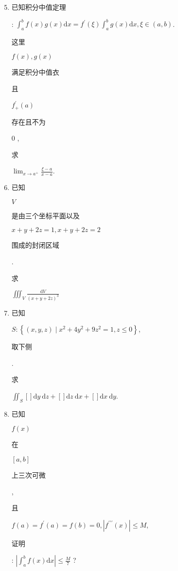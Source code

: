 \documentclass[10pt]{article}
\begin{document}
\begin{enumerate}
  \setcounter{enumi}{4}
  \item \begin{CJK}{UTF8}{mj}已知积分中值定理\end{CJK}: $\int_{a}^{b} f(x) g(x) \mathrm{d} x=f^{\prime}(\xi) \int_{a}^{b} g(x) \mathrm{d} x, \xi \in(a, b)$. \begin{CJK}{UTF8}{mj}这里\end{CJK} $f(x), g(x)$ \begin{CJK}{UTF8}{mj}满足积分中值衣\end{CJK} \begin{CJK}{UTF8}{mj}且\end{CJK} $f_{+}^{\prime}(a)$ \begin{CJK}{UTF8}{mj}存在且不为\end{CJK} 0 , \begin{CJK}{UTF8}{mj}求\end{CJK} $\lim _{x \rightarrow a^{+}} \frac{\xi-a}{x-a}$.

  \item \begin{CJK}{UTF8}{mj}已知\end{CJK} $V$ \begin{CJK}{UTF8}{mj}是由三个坐标平面以及\end{CJK} $x+y+2 z=1, x+y+2 z=2$ \begin{CJK}{UTF8}{mj}围成的封闭区域\end{CJK}. \begin{CJK}{UTF8}{mj}求\end{CJK} $\iiint_{V} \frac{\mathrm{d} V}{(x+y+2 z)^{3}}$

  \item \begin{CJK}{UTF8}{mj}已知\end{CJK} $S:\left\{(x, y, z) \mid x^{2}+4 y^{2}+9 z^{2}=1, z \leq 0\right\}$, \begin{CJK}{UTF8}{mj}取下侧\end{CJK}.\begin{CJK}{UTF8}{mj}求\end{CJK} $\iint_{S}[] \mathrm{d} y \mathrm{~d} z+[] \mathrm{d} z \mathrm{~d} x+[] \mathrm{d} x \mathrm{~d} y$.

  \item \begin{CJK}{UTF8}{mj}已知\end{CJK} $f(x)$ \begin{CJK}{UTF8}{mj}在\end{CJK} $[a, b]$ \begin{CJK}{UTF8}{mj}上三次可微\end{CJK}, \begin{CJK}{UTF8}{mj}且\end{CJK} $f(a)=f^{\prime}(a)=f(b)=0,\left|f^{\prime \prime \prime}(x)\right| \leq M$, \begin{CJK}{UTF8}{mj}证明\end{CJK}: $\left|\int_{a}^{b} f(x) \mathrm{d} x\right| \leq \frac{M}{7}$ ?


\end{enumerate}
\end{document}
